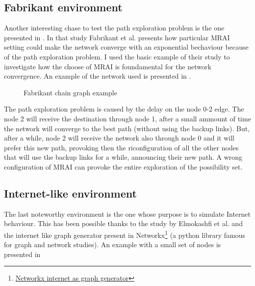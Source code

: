 \subsection{Fabrikant environment}
\label{subsec:fabrikant_env}

Another interesting chase to test the path exploration problem is the one
presented in \cite{fabrikant2011there}.
In that study Fabrikant et al. presents how particular \ac{MRAI} setting could 
make the network converge with an exponential bechaviour because of the path
exploration problem.
I used the basic example of their study to investigate how the choose of \ac{MRAI}
is foundamental for the network convergence.
An example of the network used is presented 
in .

\begin{figure}[h]                                                               
    \begin{center}                                                              
        
    \end{center}                                                                
    \caption{Fabrikant chain graph example}                                
    \label{fig:fabrikant_graph}
\end{figure}

The path exploration problem is caused by the delay on the node \num{0}-\num{2}
edge. The node 2 will receive the destination through node 1, after a small ammount
of time the network will converge to the best path (without using the backup links).
But, after a while, node \num{2} will receive the network also through node \num{0}
and it will prefer this new path, provoking then the riconfiguration of all
the other nodes that will use the backup links for a while, announcing their 
new path.
A wrong configuration of \ac{MRAI} can provoke the entire exploration of the 
possibility set.

\subsection{Internet-like environment}
\label{subsec:internet_like_env}

The last noteworthy environment is the one whose purpose is to simulate Internet
behaviour.
This has been possible thanks to the study by Elmokashfi et al. \cite{elmokashfi2010scalability}
and the internet like graph generator present in Networkx\footnote{\href{https://networkx.org/documentation/stable/reference/generated/networkx.generators.internet_as_graphs.random_internet_as_graph.html#networkx.generators.internet_as_graphs.random_internet_as_graph}{Networkx internet as graph generator}}
(a python library famous for graph and network studies).
An example with a small set of nodes is presented in 

